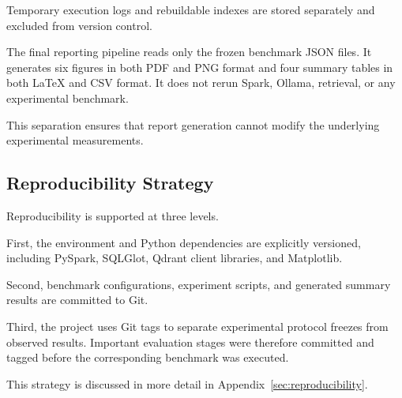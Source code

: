 Temporary execution logs and rebuildable indexes are stored separately and
excluded from version control.

The final reporting pipeline reads only the frozen benchmark JSON files. It
generates six figures in both PDF and PNG format and four summary tables in
both LaTeX and CSV format. It does not rerun Spark, Ollama, retrieval, or any
experimental benchmark.

This separation ensures that report generation cannot modify the underlying
experimental measurements.


\subsection{Reproducibility Strategy}

Reproducibility is supported at three levels.

First, the environment and Python dependencies are explicitly versioned,
including PySpark, SQLGlot, Qdrant client libraries, and Matplotlib.

Second, benchmark configurations, experiment scripts, and generated summary
results are committed to Git.

Third, the project uses Git tags to separate experimental protocol freezes
from observed results. Important evaluation stages were therefore committed
and tagged before the corresponding benchmark was executed.

This strategy is discussed in more detail in
Appendix~\ref{sec:reproducibility}.
